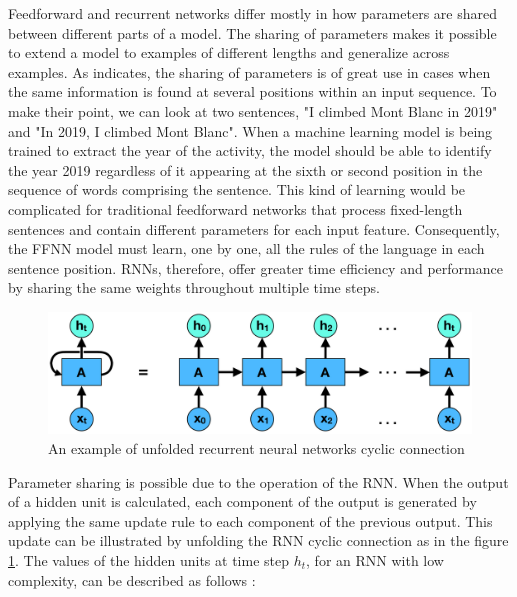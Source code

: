 Feedforward and recurrent networks differ mostly in how parameters are shared between different parts of a model. The sharing of parameters makes it possible to extend a model to examples of different lengths and generalize across examples. As \textcite{goodfellow2016deep} indicates, the sharing of parameters is of great use in cases when the same information is found at several positions within an input sequence. To make their point, we can look at two sentences, "I climbed Mont Blanc in 2019" and "In 2019, I climbed Mont Blanc". When a machine learning model is being trained to extract the year of the activity, the model should be able to identify the year 2019 regardless of it appearing at the sixth or second position in the sequence of words comprising the sentence. This kind of learning would be complicated for traditional feedforward networks that process fixed-length sentences and contain different parameters for each input feature. Consequently, the FFNN model must learn, one by one, all the rules of the language in each sentence position. RNNs, therefore, offer greater time efficiency and performance by sharing the same weights throughout multiple time steps. \parencite{goodfellow2016deep}

\begin{figure}[h]
    \centering
    \includegraphics[width=\textwidth,height=\textheight,keepaspectratio]{rnn_unfold}
    \caption{An example of unfolded recurrent neural networks cyclic connection}
    \label{fig:rnn_unfold}
\end{figure}

Parameter sharing is possible due to the operation of the RNN. When the output of a hidden unit is calculated, each component of the output is generated by applying the same update rule to each component of the previous output. This update can be illustrated by unfolding the RNN cyclic connection as in the figure \ref{fig:rnn_unfold}. The values of the hidden units at time step $h_t$, for an RNN with low complexity, can be described as follows \parencite{goodfellow2016deep}:


